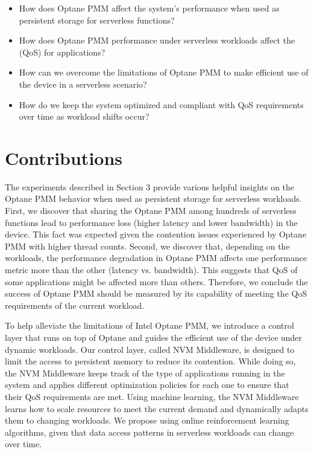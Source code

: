 \begin{itemize}
    \item How does Optane PMM affect the system’s performance when used as persistent storage for serverless functions?
    \item How does Optane PMM performance under serverless workloads affect the (QoS) for applications?
    \item How can we overcome the limitations of Optane PMM to make efficient use of the device in a serverless scenario?
    \item How do we keep the system optimized and compliant with QoS requirements over time as workload shifts occur?
\end{itemize}

\section{Contributions}

The experiments described in Section 3 provide various helpful insights on the Optane PMM behavior when used as persistent storage for serverless workloads. First, we discover that sharing the Optane PMM among hundreds of serverless functions lead to performance loss (higher latency and lower bandwidth) in the device. This fact was expected given the contention issues experienced by Optane PMM with higher thread counts. Second, we discover that, depending on the workloads, the performance degradation in Optane PMM affects one performance metric more than the other (latency vs. bandwidth). This suggests that QoS of some applications might be affected more than others. Therefore, we conclude the success of Optane PMM should be measured by its capability of meeting the QoS requirements of the current workload.

To help alleviate the limitations of Intel Optane PMM, we introduce a control layer that runs on top of Optane and guides the efficient use of the device under dynamic workloads.  Our control layer, called NVM Middleware, is designed to limit the access to persistent memory to reduce its contention. While doing so, the NVM Middleware keeps track of the type of applications running in the system and applies different optimization policies for each one to ensure that their QoS requirements are met. Using machine learning, the NVM Middleware learns how to scale resources to meet the current demand and dynamically adapts them to changing workloads. We propose using online reinforcement learning algorithms, given that data access patterns in serverless workloads can change over time.

